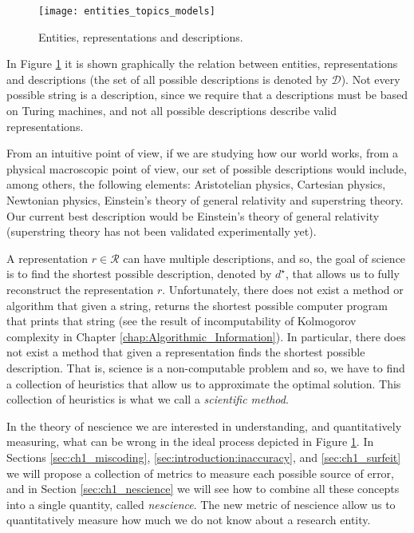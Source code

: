 \begin{figure}[h]
\centering\texttt{[image: entities\_topics\_models]}
\caption{\label{fig:entities_topics_models}Entities, representations and descriptions.}
\end{figure}

In Figure \ref{fig:entities_topics_models} it is shown graphically the relation between entities, representations and descriptions (the set of all possible descriptions is denoted by $\mathcal{D}$). Not every possible string is a description, since we require that a descriptions must be based on Turing machines, and not all possible descriptions describe valid representations.

\begin{example}
From an intuitive point of view, if we are studying how our world works, from a physical macroscopic point of view, our set of possible descriptions would include, among others, the following elements: Aristotelian physics, Cartesian physics, Newtonian physics, Einstein's theory of general relativity and superstring theory. Our current best description would be  Einstein's theory of general relativity (superstring theory has not been validated experimentally yet).
\end{example}

A representation $r \in \mathcal{R}$ can have multiple descriptions, and so, the goal of science is to find the shortest possible description, denoted by $d^\star$, that allows us to fully reconstruct the representation $r$. Unfortunately, there does not exist a method or algorithm that given a string, returns the shortest possible computer program that prints that string (see the result of incomputability of Kolmogorov complexity in Chapter \ref{chap:Algorithmic_Information}). In particular, there does not exist a method that given a representation finds the shortest possible description. That is, science is a non-computable problem and so, we have to find a collection of heuristics that allow us to approximate the optimal solution. This collection of heuristics is what we call a \emph{scientific method}.

In the theory of nescience we are interested in understanding, and quantitatively measuring, what can be wrong in the ideal process depicted in Figure \ref{fig:entities_topics_models}. In Sections \ref{sec:ch1_miscoding}, \ref{sec:introduction:inaccuracy}, and \ref{sec:ch1_surfeit} we will propose a collection of metrics to measure each possible source of error, and in Section \ref{sec:ch1_nescience} we will see how to combine all these concepts into a single quantity, called \emph{nescience}. The new metric of nescience allow us to quantitatively measure how much we do not know about a research entity.

